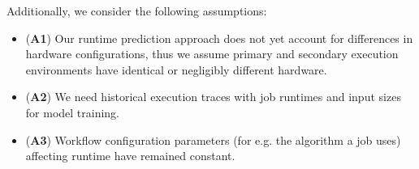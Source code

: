Additionally, we consider the following assumptions:

\begin{itemize}[label={}]
    \item (\textbf{A1}) Our runtime prediction approach does not yet account for differences in hardware configurations, thus we assume primary and secondary execution environments have identical or negligibly different hardware.
    \item (\textbf{A2}) We need historical execution traces with job runtimes and input sizes for model training.
    \item (\textbf{A3}) Workflow configuration parameters (for e.g. the algorithm a job uses) affecting runtime have remained constant.
\end{itemize}